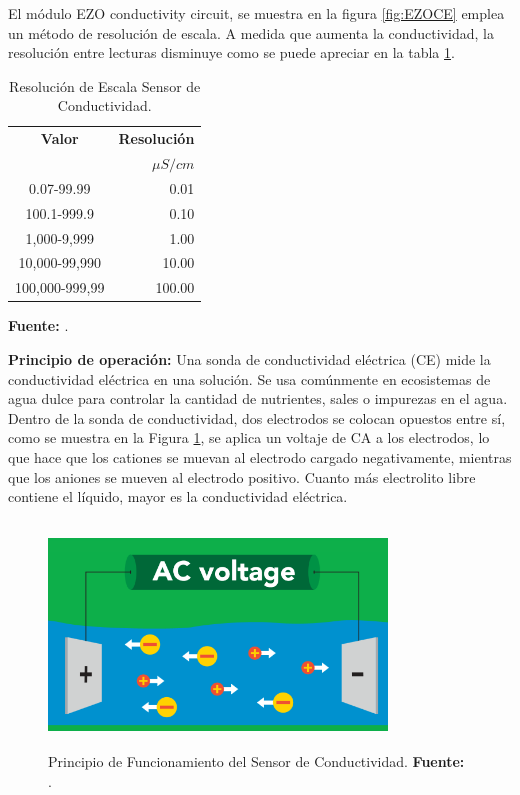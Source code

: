El m\'odulo EZO conductivity circuit, se muestra en la figura \ref{fig:EZOCE} emplea un m\'etodo de resoluci\'on de escala. A medida que aumenta la conductividad, la resoluci\'on entre lecturas disminuye como se puede apreciar en la tabla \ref{tab:resol_ce}.

\begin{table}[t]
    \protect\caption[Resolución de Escala Sensor de Conductividad]{Resolución de Escala Sensor de Conductividad.}\label{tab:resol_ce}
    \centering
    \begin{tabular}{ c r }
    \toprule
    \textbf{Valor}&\textbf{Resolución} \\
          &  $\mu S/cm$ \\
         \midrule
         0.07-99.99 & 0.01  \\
         100.1-999.9 & 0.10 \\
         1,000-9,999 & 1.00 \\
         10,000-99,990 & 10.00 \\
         100,000-999,99 & 100.00  \\
    \bottomrule
    \end{tabular}
    \vspace{5mm}
    \newline
    \textbf{Fuente: }\cite{ezoce}.
\end{table}

\textbf{Principio de operaci\'on: }
Una sonda de conductividad el\'ectrica (CE) mide la conductividad el\'ectrica en una soluci\'on. Se usa com\'unmente en ecosistemas de agua dulce para controlar la cantidad de nutrientes, sales o impurezas en el agua.
Dentro de la sonda de conductividad, dos electrodos se colocan opuestos entre s\'i, como se muestra en la Figura \ref{fig:SensorCEfun}, se aplica un voltaje de CA a los electrodos, lo que hace que los cationes se muevan al electrodo cargado negativamente, mientras que los aniones se mueven al electrodo positivo. Cuanto más electrolito libre contiene el l\'iquido, mayor es la conductividad el\'ectrica.

\begin{figure}[H]
    \centering
    \includegraphics[width=90mm, height=60mm]{Imagenes/2021/imag37.png}
    \caption[Principio de Funcionamiento del Sensor de Conductividad]{Principio de Funcionamiento del Sensor de Conductividad. \textbf{Fuente: }\cite{ezoce}.}
    \label{fig:SensorCEfun}
\end{figure}


